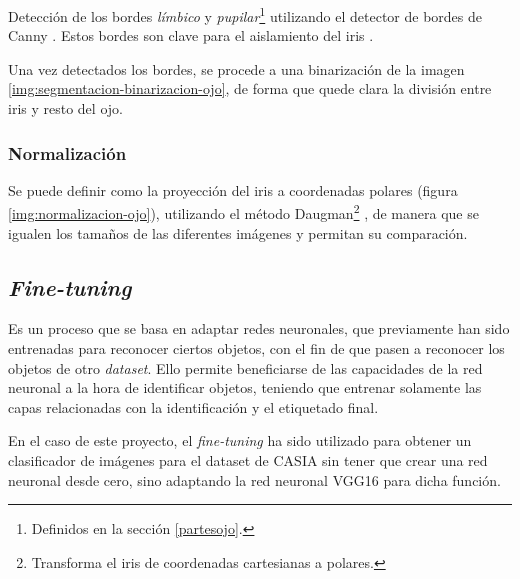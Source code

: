 Detección de los bordes \textit{límbico} y \textit{pupilar}\footnote{Definidos en la sección \ref{partesojo}.} utilizando el detector de bordes de Canny \cite{4767851}. Estos bordes son clave para el aislamiento del iris \cite{tfg_iris_2020}.




Una vez detectados los bordes, se procede a una binarización de la imagen \ref{img:segmentacion-binarizacion-ojo}, de forma que quede clara la división entre iris y resto del ojo.



\subsubsection{Normalización}\label{subsubsec:normalizacion}

Se puede definir como la proyección del iris a coordenadas polares (figura \ref{img:normalizacion-ojo}), utilizando el método Daugman\footnote{Transforma el iris de coordenadas cartesianas a polares.} \cite{daugman_normalization_1993}, de manera que se igualen los tamaños de las diferentes imágenes y permitan su comparación.



\subsection{\textit{Fine-tuning}}\label{subsec:fine-tuning}
 Es un proceso que se basa en adaptar redes neuronales, que previamente han sido entrenadas para reconocer ciertos objetos, con el fin de que pasen a reconocer los objetos de otro \textit{dataset}. 
 Ello permite beneficiarse de las capacidades de la red neuronal a la hora de identificar objetos, teniendo que entrenar solamente las capas relacionadas con la identificación y el etiquetado final. 
 
 En el caso de este proyecto, el \textit{fine-tuning} ha sido utilizado para obtener un clasificador de imágenes para el dataset de CASIA sin tener que crear una red neuronal desde cero, sino adaptando la red
  neuronal VGG16 para dicha función.

